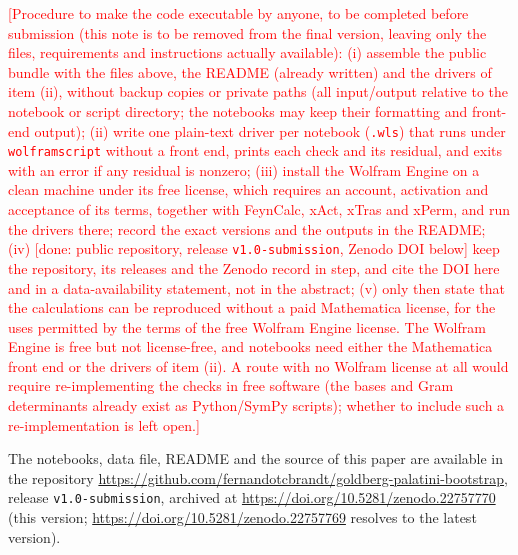 \documentclass[prd,aps,preprint,superscriptaddress,nofootinbib,amsmath,amssymb,eqsecnum]{revtex4-2}
\newcommand{\todo}[1]{\textcolor{red}{[#1]}}
\providecommand{\DIFaddbegin}{} %
\providecommand{\DIFaddend}{} %
\providecommand{\DIFdelbegin}{} %
\providecommand{\DIFdelend}{} %
\begin{document}
\todo{Procedure to make the code executable by anyone, to be completed before submission
(this note is to be removed from the final version, leaving only the files, requirements and
instructions actually available):
(i) assemble the public bundle with the files above, the README (already written) and the
drivers of item (ii), without backup copies or private paths (all input/output relative to the notebook or
script directory; the notebooks may keep their formatting and front-end output);
(ii) write one plain-text driver per notebook
(\texttt{.wls}) that runs under \texttt{wolframscript} without a front end, prints each
check and its residual, and exits with an error if any residual is nonzero;
(iii) install the Wolfram Engine on a clean machine under its free license, which requires
an account, activation and acceptance of its terms,
together with FeynCalc, xAct, xTras and xPerm, and run the drivers there; record the exact
versions and the outputs in the README; (iv) [done: public repository, release \texttt{v1.0-submission}, Zenodo DOI below]
keep the repository, its releases and the Zenodo record in step, and cite the DOI here and
in a data-availability statement, not in the abstract; (v) only then state that the calculations can be
reproduced without a paid Mathematica license, for the uses permitted by the terms of the
free Wolfram Engine license. The Wolfram Engine is free but not license-free, and
notebooks need either the Mathematica front end or the drivers of item (ii). A route with no Wolfram license at all would require re-implementing
the checks in free software (the bases and Gram determinants already exist as Python/SymPy
scripts); whether to include such a re-implementation is left open.}

The notebooks, data file, README and the source of this paper are available in the
repository \url{https://github.com/fernandotcbrandt/goldberg-palatini-bootstrap}, release
\texttt{v1.0-submission}, archived at \url{https://doi.org/10.5281/zenodo.22757770} (this
version; \url{https://doi.org/10.5281/zenodo.22757769} resolves to the latest version).



\DIFdelbegin %
\DIFdelend \DIFaddbegin 
\DIFaddend 
\end{document}
